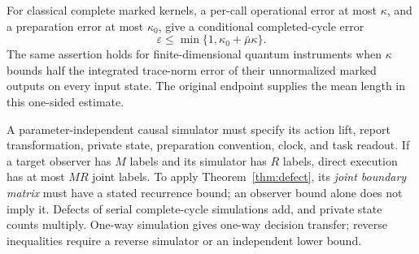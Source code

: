 \begin{proposition}\label{prop:primitive}
For classical complete marked kernels, a per-call operational error at most $\kappa$, and a preparation error at most $\kappa_0$, give a conditional completed-cycle error
\begin{equation}\label{eq:primitive-error}
 \varepsilon\le\min\{1,\kappa_0+\bar\mu\kappa\}.
\end{equation}
The same assertion holds for finite-dimensional quantum instruments when $\kappa$ bounds half the integrated trace-norm error of their unnormalized marked outputs on every input state. The original endpoint supplies the mean length in this one-sided estimate.

A parameter-independent causal simulator must specify its action lift, report transformation, private state, preparation convention, clock, and task readout. If a target observer has $M$ labels and its simulator has $R$ labels, direct execution has at most $MR$ joint labels. To apply Theorem~\ref{thm:defect}, its \emph{joint boundary matrix} must have a stated recurrence bound; an observer bound alone does not imply it. Defects of serial complete-cycle simulations add, and private state counts multiply. One-way simulation gives one-way decision transfer; reverse inequalities require a reverse simulator or an independent lower bound.
\end{proposition}
